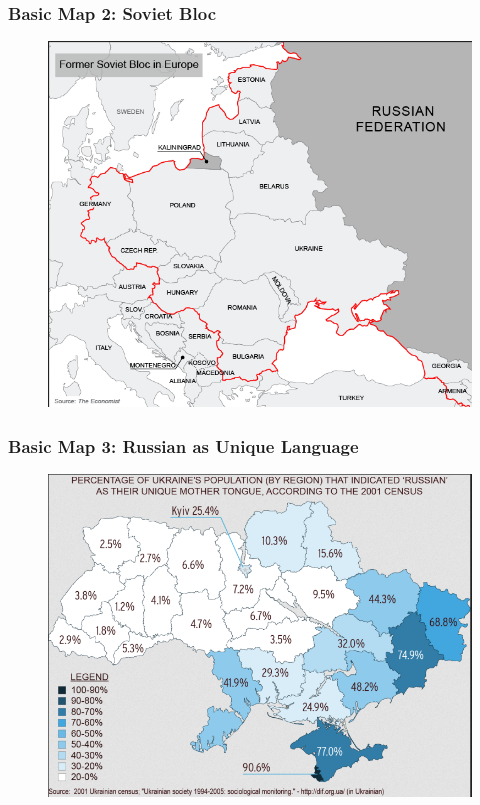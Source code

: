 \documentclass[handout]{beamer}
\begin{document}
\begin{frame} 
	\frametitle{\LARGE{Basic Map 2: Soviet Bloc}}
	\begin{figure}[ht!]
		\centering
		\includegraphics[width=\textwidth,height=0.9\textheight,keepaspectratio]{map2.png}
	\end{figure}
\end{frame}

\begin{frame} 
	\frametitle{\LARGE{Basic Map 3: Russian as Unique Language}}
	\begin{figure}[ht!]
		\centering
		\includegraphics[width=\textwidth,height=0.9\textheight,keepaspectratio]{map3.png}
	\end{figure}
\end{frame}
\end{document}
